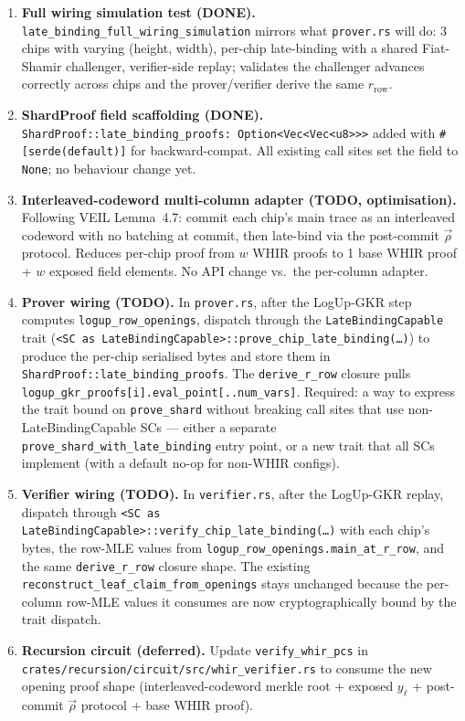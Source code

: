 \begin{enumerate}
        WHIR types in \texttt{StarkGenericConfig} and without
        unsafe transmute.
  \item \textbf{Full wiring simulation test (DONE).}
        \texttt{late\_binding\_full\_wiring\_simulation} mirrors what
        \texttt{prover.rs} will do: 3 chips with varying
        (height, width), per-chip late-binding with a shared
        Fiat-Shamir challenger, verifier-side replay; validates the
        challenger advances correctly across chips and the
        prover/verifier derive the same $r_{\mathrm{row}}$.
  \item \textbf{ShardProof field scaffolding (DONE).}
        \texttt{ShardProof::late\_binding\_proofs:
        Option<Vec<Vec<u8>>>} added with
        \texttt{\#[serde(default)]} for backward-compat.  All
        existing call sites set the field to \texttt{None}; no
        behaviour change yet.
  \item \textbf{Interleaved-codeword multi-column adapter (TODO,
        optimisation).}
        Following VEIL Lemma~4.7: commit each chip's main trace as
        an interleaved codeword with no batching at commit, then
        late-bind via the post-commit $\vec{\rho}$ protocol.  Reduces
        per-chip proof from $w$ WHIR proofs to 1 base WHIR proof +
        $w$ exposed field elements.  No API change vs.~the per-column
        adapter.
  \item \textbf{Prover wiring (TODO).}
        In \texttt{prover.rs}, after the LogUp-GKR step computes
        \texttt{logup\_row\_openings}, dispatch through the
        \texttt{LateBindingCapable} trait
        (\texttt{<SC as LateBindingCapable>::prove\_chip\_late\_binding(\ldots)})
        to produce the per-chip serialised bytes and store them in
        \texttt{ShardProof::late\_binding\_proofs}.  The
        \texttt{derive\_r\_row} closure pulls
        \texttt{logup\_gkr\_proofs[i].eval\_point[..num\_vars]}.
        Required: a way to express the trait bound on
        \texttt{prove\_shard} without breaking call sites that use
        non-LateBindingCapable SCs --- either a separate
        \texttt{prove\_shard\_with\_late\_binding} entry point, or a
        new trait that all SCs implement (with a default no-op for
        non-WHIR configs).
  \item \textbf{Verifier wiring (TODO).}
        In \texttt{verifier.rs}, after the LogUp-GKR replay,
        dispatch through
        \texttt{<SC as LateBindingCapable>::verify\_chip\_late\_binding(\ldots)}
        with each chip's bytes, the row-MLE values from
        \texttt{logup\_row\_openings.main\_at\_r\_row}, and the same
        \texttt{derive\_r\_row} closure shape.  The existing
        \texttt{reconstruct\_leaf\_claim\_from\_openings} stays
        unchanged because the per-column row-MLE values it consumes
        are now cryptographically bound by the trait dispatch.
  \item \textbf{Recursion circuit (deferred).}
        Update \texttt{verify\_whir\_pcs} in
        \texttt{crates/recursion/circuit/src/whir\_verifier.rs} to
        consume the new opening proof shape (interleaved-codeword
        merkle root + exposed $y_\ell$ + post-commit $\vec{\rho}$
        protocol + base WHIR proof).
\end{enumerate}
